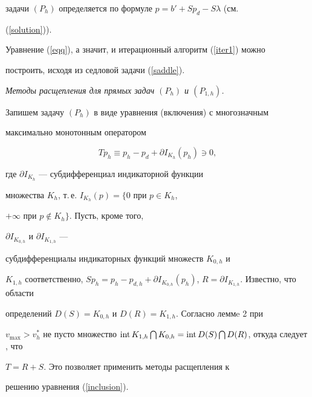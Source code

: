 задачи $(P_h)$ определяется по формуле $p=b'+Sp_d-S\lambda$ (см.


(\ref{solution})).





\begin{note}


Уравнение (\ref{eqq}), а значит, и итерационный алгоритм (\ref{iter1}) можно


построить, исходя из седловой задачи (\ref{saddle}).


\end{note}





{\it Методы расщепления для прямых задач $(P_h)$ и $(P_{1,h})$.}


Запишем задачу $(P_h)$ в виде уравнения (включения) с многозначным


максимально монотонным оператором


\begin{equation}\label{inclusion}


Tp_h\equiv p_h -p_d+\partial I_{K_h}(p_h)\ni 0,


\end{equation}


где $\partial I_{K_h}$ --- субдифференциал индикаторной функции


множества $K_h$, т.\,е. $I_{K_h}(p)=\{0$ при $p\in K_h$,


$+\infty$ при $p \notin K_h\}$. Пусть, кроме того,


$\partial I_{K_{0,h}}$ и $\partial I_{K_{1,h}}$ ---


субдифференциалы индикаторных функций множеств $K_{0,h}$ и


$K_{1,h}$ соответственно, $Sp_h=p_h -p_{d,h}+\partial


I_{K_{0,h}}(p_h)$, $R=\partial I_{K_{1,h}}$. Известно, что области


определений $D(S)=K_{0,h}$ и $D(R)=K_{1,h}$. Согласно леммe 2 при


$v_{\max}> v_h^{*}$ не пусто множество $\Int K_{1,h}\bigcap


K_{0,h}= \Int D(S)\bigcap D(R)$, откуда следует \cite{Barbu}, что


$T=R+S$. Это позволяет применить методы расщепления \cite{Lions} к


решению уравнения (\ref{inclusion}).





